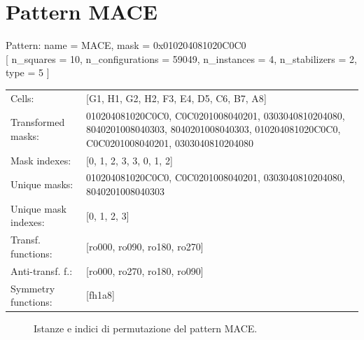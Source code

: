 \newpage

\section{Pattern MACE}

\begin{tcolorbox}[sharp corners, fontupper=\ttfamily\small, colback=white]
  \noindent Pattern: name = MACE, mask = 0x010204081020C0C0\\
  {[} n\_squares = 10, n\_configurations = 59049,
  n\_instances = 4, n\_stabilizers = 2, type = 5 { ]}\\[1.0ex]
  \begin{tabularx}{\textwidth}{@{} p{3.5cm} X @{}}
    Cells:               & {[}G1, H1, G2, H2, F3, E4, D5, C6, B7, A8{]}\\[0.5ex]
    Transformed masks:   & 010204081020C0C0, C0C0201008040201, 0303040810204080, 8040201008040303, 8040201008040303, 010204081020C0C0, C0C0201008040201, 0303040810204080\\[0.5ex]
    Mask indexes:        & {[}0, 1, 2, 3, 3, 0, 1, 2{]}\\[0.5ex]
    Unique masks:        & 010204081020C0C0, C0C0201008040201, 0303040810204080, 8040201008040303\\[0.5ex]
    Unique mask indexes: & {[}0, 1, 2, 3{]}\\[0.5ex]
    Transf. functions:   & {[}ro000, ro090, ro180, ro270{]}\\[0.5ex]
    Anti-transf. f.:     & {[}ro000, ro270, ro180, ro090{]}\\[0.5ex]
    Symmetry functions:  & {[}fh1a8{]}\\[0.5ex]
  \end{tabularx}
\end{tcolorbox}

\begin{figure}[htbp]
  \centering
   \hfill
   \hfill
   \hfill
  \vspace{0.3cm}
   \hfill
   \hfill
   \hfill
  \caption{Istanze e indici di permutazione del pattern MACE.}
\end{figure}

